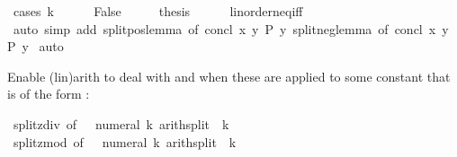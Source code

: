 \begin{isabellebody}
%
\isadelimproof
%
\endisadelimproof
%
\isatagproof
{}\isamarkupfalse%
\ {\isacharparenleft}{\kern0pt}cases\ {\isachardoublequoteopen}k\ {\isacharequal}{\kern0pt}\ {}{\isachardoublequoteclose}{\isacharparenright}{\kern0pt}\isanewline
\ \ \isamarkupfalse%
\ False\isanewline
\ \ \isamarkupfalse%
\ \isamarkupfalse%
\ {\isacharquery}{\kern0pt}thesis\isanewline
\ \ \ \ \isamarkupfalse%
\ linorder{\isacharunderscore}{\kern0pt}neq{\isacharunderscore}{\kern0pt}iff\isanewline
\ \ \ \ \isamarkupfalse%
\ {\isacharparenleft}{\kern0pt}auto\ simp\ add{\isacharcolon}{\kern0pt}\ split{\isacharunderscore}{\kern0pt}pos{\isacharunderscore}{\kern0pt}lemma\ {\isacharbrackleft}{\kern0pt}of\ concl{\isacharcolon}{\kern0pt}\ {\isachardoublequoteopen}{\isasymlambda}x\ y{\isachardot}{\kern0pt}\ P\ y{\isachardoublequoteclose}{\isacharbrackright}{\kern0pt}\ split{\isacharunderscore}{\kern0pt}neg{\isacharunderscore}{\kern0pt}lemma\ {\isacharbrackleft}{\kern0pt}of\ concl{\isacharcolon}{\kern0pt}\ {\isachardoublequoteopen}{\isasymlambda}x\ y{\isachardot}{\kern0pt}\ P\ y{\isachardoublequoteclose}{\isacharbrackright}{\kern0pt}{\isacharparenright}{\kern0pt}\isanewline
{}\isamarkupfalse%
\ auto%
\endisatagproof
{\isafoldproof}%
%
\isadelimproof
%
\endisadelimproof
%
\begin{isamarkuptext}%
Enable (lin)arith to deal with  and 
  when these are applied to some constant that is of the form
  :%
\end{isamarkuptext}\isamarkuptrue%
\isamarkupfalse%
\ split{\isacharunderscore}{\kern0pt}zdiv\ {\isacharbrackleft}{\kern0pt}of\ {\isacharunderscore}{\kern0pt}\ {\isacharunderscore}{\kern0pt}\ {\isachardoublequoteopen}numeral\ k{\isachardoublequoteclose}{\isacharcomma}{\kern0pt}\ arith{\isacharunderscore}{\kern0pt}split{\isacharbrackright}{\kern0pt}\ \ k\isanewline
{}\isamarkupfalse%
\ split{\isacharunderscore}{\kern0pt}zmod\ {\isacharbrackleft}{\kern0pt}of\ {\isacharunderscore}{\kern0pt}\ {\isacharunderscore}{\kern0pt}\ {\isachardoublequoteopen}numeral\ k{\isachardoublequoteclose}{\isacharcomma}{\kern0pt}\ arith{\isacharunderscore}{\kern0pt}split{\isacharbrackright}{\kern0pt}\ \ k%
\isadelimdocument
%
\endisadelimdocument
%
\isatagdocument
%
\end{isabellebody}
